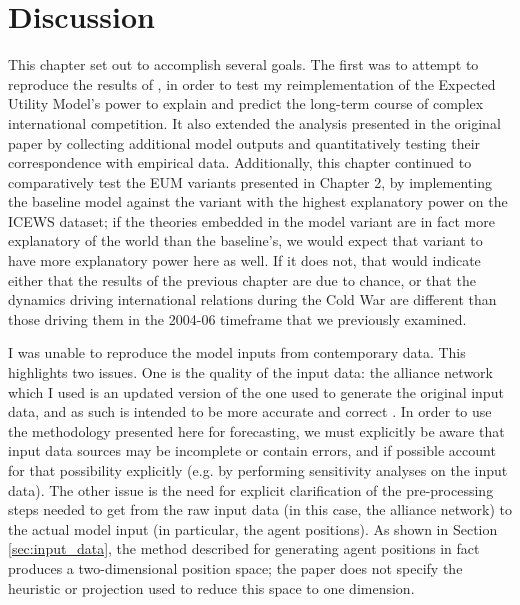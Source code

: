 \section{Discussion} \label{cw_discussion}




This chapter set out to accomplish several goals. The first was to attempt to reproduce the results of \citet{bdm_1998}, in order to test my reimplementation of the Expected Utility Model's power to explain and predict the long-term course of complex international competition. It also extended the analysis presented in the original paper by collecting additional model outputs and quantitatively testing their correspondence with empirical data. Additionally, this chapter continued to comparatively test the EUM variants presented in Chapter 2, by implementing the baseline model against the variant with the highest explanatory power on the ICEWS dataset; if the theories embedded in the model variant are in fact more explanatory of the world than the baseline's, we would expect that variant to have more explanatory power here as well. If it does not, that would indicate either that the results of the previous chapter are due to chance, or that the dynamics driving international relations during the Cold War are different than those driving them in the 2004-06 timeframe that we previously examined.

I was unable to reproduce the model inputs from contemporary data. This highlights two issues. One is the quality of the input data: the alliance network which I used is an updated version of the one used to generate the original input data, and as such is intended to be more accurate and correct \citep{gibler_2013}. In order to use the methodology presented here for forecasting, we must explicitly be aware that input data sources may be incomplete or contain errors, and if possible account for that possibility explicitly (e.g. by performing sensitivity analyses on the input data). The other issue is the need for explicit clarification of the pre-processing steps needed to get from the raw input data (in this case, the alliance network) to the actual model input (in particular, the agent positions). As shown in Section \ref{sec:input_data}, the method described for generating agent positions in fact produces a two-dimensional position space; the paper does not specify the heuristic or projection used to reduce this space to one dimension.


